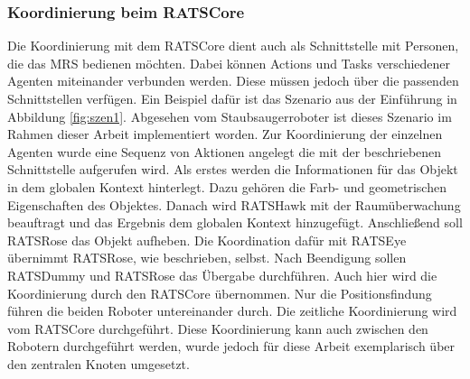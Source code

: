 \subsubsection{Koordinierung beim RATSCore}
Die Koordinierung mit dem RATSCore dient auch als Schnittstelle mit Personen, die das MRS bedienen möchten. Dabei können Actions und Tasks verschiedener Agenten miteinander verbunden werden. Diese müssen jedoch über die passenden Schnittstellen verfügen. Ein Beispiel dafür ist das Szenario aus der Einführung in Abbildung \ref{fig:szen1}. Abgesehen vom Staubsaugerroboter ist dieses Szenario im Rahmen dieser Arbeit implementiert worden. Zur Koordinierung der einzelnen Agenten wurde eine Sequenz von Aktionen angelegt die mit der beschriebenen Schnittstelle aufgerufen wird. Als erstes werden die Informationen für das Objekt in dem globalen Kontext hinterlegt. Dazu gehören die Farb- und geometrischen Eigenschaften des Objektes. Danach wird RATSHawk mit der Raumüberwachung beauftragt und das Ergebnis dem globalen Kontext hinzugefügt. Anschließend soll RATSRose das Objekt aufheben. Die Koordination dafür mit RATSEye übernimmt RATSRose, wie beschrieben, selbst. Nach Beendigung sollen RATSDummy und RATSRose das Übergabe durchführen. Auch hier wird die Koordinierung durch den RATSCore übernommen. Nur die Positionsfindung führen die beiden Roboter untereinander durch. Die zeitliche Koordinierung wird vom RATSCore durchgeführt. Diese Koordinierung kann auch zwischen den Robotern durchgeführt werden, wurde jedoch für diese Arbeit exemplarisch über den zentralen Knoten umgesetzt.

